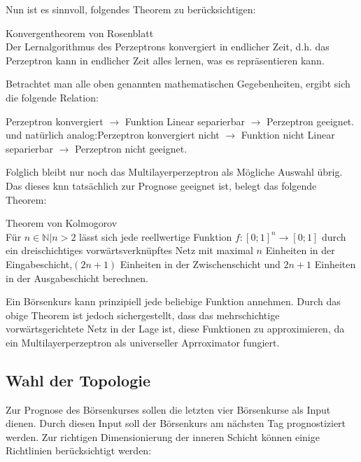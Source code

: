 Nun ist es sinnvoll, folgendes Theorem zu berücksichtigen:
 
\begin{theo}Konvergentheorem von Rosenblatt\\
Der Lernalgorithmus des Perzeptrons konvergiert in endlicher Zeit, d.h. das Perzeptron kann in endlicher Zeit alles lernen, was es repräsentieren kann.
\end{theo}

Betrachtet man alle oben genannten mathematischen Gegebenheiten, ergibt sich die folgende Relation:

Perzeptron konvergiert $\rightarrow$ Funktion Linear separierbar $\rightarrow$ Perzeptron geeignet.
und natürlich analog:Perzeptron konvergiert nicht $\rightarrow$ Funktion nicht Linear separierbar $\rightarrow$ Perzeptron nicht geeignet.

Folglich bleibt nur noch das Multilayerperzeptron als Mögliche Auswahl übrig. Das dieses \ac{knn} tatsächlich zur Prognose geeignet ist, belegt das folgende Theorem:

\begin{theo}Theorem von Kolmogorov\\
Für ${n \in \mathbb{N} | n>2}$ lässt sich jede reellwertige Funktion $f:[0;1]^n\rightarrow[0;1]$ durch ein dreischichtiges vorwärtsverknüpftes Netz mit maximal $n$ Einheiten in der Eingabeschicht,$(2n+1)$ Einheiten in der Zwischenschicht und $2n+1$ Einheiten in der Ausgabeschicht berechnen.
\end{theo}

Ein Börsenkurs kann prinzipiell jede beliebige Funktion annehmen. Durch das obige Theorem ist jedoch sichergestellt, dass das mehrschichtige vorwärtsgerichtete Netz in der Lage ist, diese Funktionen zu approximieren, da ein Multilayerperzeptron als universeller Aprroximator fungiert.

\subsection{Wahl der Topologie}
\label{subsection:Wahl der Topologie}

Zur Prognose des Börsenkurses sollen die letzten vier Börsenkurse als Input dienen. Durch diesen Input soll der Börsenkurs am nächsten Tag prognostiziert werden. Zur richtigen Dimensionierung der inneren Schicht können einige Richtlinien berücksichtigt werden:

